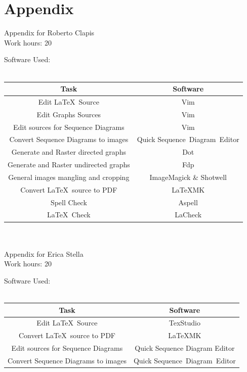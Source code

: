 \documentclass{article}
\begin{document}
	\section{Appendix}
	Appendix for Roberto Clapis\\
	Work hours: 20
	\begin{center}
		Software Used:\\
		\-\\
		\begin{tabular}{*{2}{c}}
			\toprule
			Task & Software \\
			\midrule
			Edit \LaTeX\ Source & Vim\\
			Edit Graphs Sources & Vim\\
			Edit sources for Sequence Diagrams & Vim\\
			Convert Sequence Diagrams to images & Quick Sequence Diagram Editor\\
			Generate and Raster directed graphs& Dot\\
			Generate and Raster undirected graphs& Fdp\\
			General images mangling and cropping & ImageMagick \& Shotwell\\
			Convert \LaTeX\ source to PDF & \LaTeX\-MK\\
			Spell Check & Aspell \\
			\LaTeX\ Check & LaCheck\\
			\bottomrule
		\end{tabular}
	\end{center}
	\-\\
	\-\\
	Appendix for Erica Stella\\
	Work hours: 20
	\begin{center}
		Software Used:\\
		\-\\
		\begin{tabular}{*{2}{c}}
			\toprule
			Task & Software \\
			\midrule
			Edit \LaTeX\ Source & TexStudio\\
			Convert \LaTeX\ source to PDF & \LaTeX\-MK\\
			Edit sources for Sequence Diagrams & Quick Sequence Diagram Editor\\
			Convert Sequence Diagrams to images & Quick Sequence Diagram Editor\\
			\bottomrule
		\end{tabular}
	\end{center}

	
\end{document}
